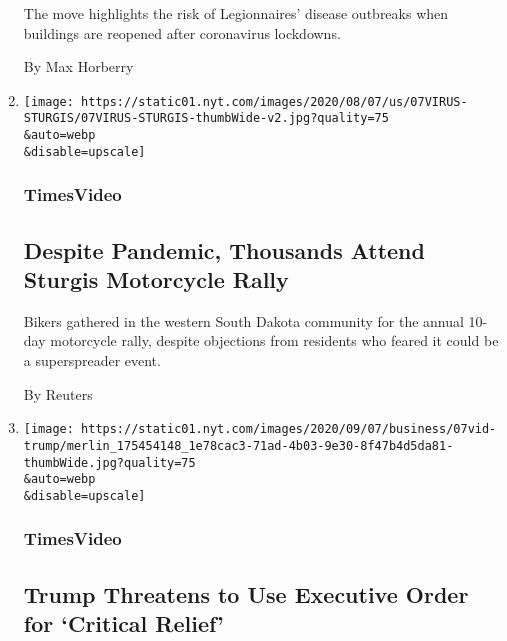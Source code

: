 \begin{enumerate}
  The move highlights the risk of Legionnaires' disease outbreaks when
  buildings are reopened after coronavirus lockdowns.

  By Max Horberry
\item
  \href{/video/us/100000007279713/sturgis-motorcycle-rally-coronavirus.html}{}

  \texttt{[image: https://static01.nyt.com/images/2020/08/07/us/07VIRUS-STURGIS/07VIRUS-STURGIS-thumbWide-v2.jpg?quality=75\\\&auto=webp\\\&disable=upscale]}

  \hypertarget{timesvideo-1}{%
  \subsubsection{TimesVideo}\label{timesvideo-1}}

  \hypertarget{despite-pandemic-thousands-attend-sturgis-motorcycle-rally}{%
  \subsection{Despite Pandemic, Thousands Attend Sturgis Motorcycle
  Rally}\label{despite-pandemic-thousands-attend-sturgis-motorcycle-rally}}

  Bikers gathered in the western South Dakota community for the annual
  10-day motorcycle rally, despite objections from residents who feared
  it could be a superspreader event.

  By Reuters
\item
  \href{/video/us/politics/100000007279339/trump-says-he-will-act-on-his-own-if-congress-doesnt-agree-on-relief.html}{}

  \texttt{[image: https://static01.nyt.com/images/2020/09/07/business/07vid-trump/merlin\_175454148\_1e78cac3-71ad-4b03-9e30-8f47b4d5da81-thumbWide.jpg?quality=75\\\&auto=webp\\\&disable=upscale]}

  \hypertarget{timesvideo-2}{%
  \subsubsection{TimesVideo}\label{timesvideo-2}}

  \hypertarget{trump-threatens-to-use-executive-order-for-critical-relief}{%
  \subsection{Trump Threatens to Use Executive Order for `Critical
  Relief'}\label{trump-threatens-to-use-executive-order-for-critical-relief}}


\end{enumerate}
